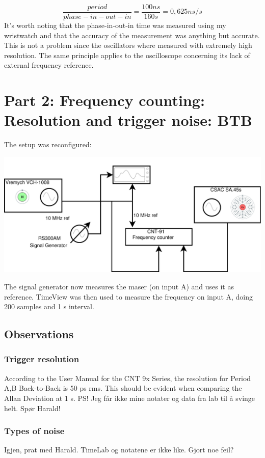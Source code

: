 \documentclass[11pt,english,a4paper]{article}
\begin{document}
\begin{displaymath}
\frac{period}{phase-in-out-in} = \frac{100 ns}{160 s} = 0,625 ns/s
\end{displaymath}
\newline
It's worth noting that the phase-in-out-in time was measured using my wristwatch and that the accuracy of the measurement was anything but accurate. This is not a problem since the oscillators where measured with extremely high resolution.
The same principle applies to the oscilloscope concerning its lack of external frequency reference.   
\newpage

\section{Part 2: Frequency counting: Resolution and trigger noise: BTB}
The setup was reconfigured:
\begin{center}
\includegraphics[width=1 \textwidth]{lab_report_diagram_del2.pdf}
\end{center}
The signal generator now measures the maser (on input A) and uses it as reference. TimeView was then used to measure the frequency  on input A, doing 200 samples and 1 s interval.

\subsection{Observations}
\subsubsection{Trigger resolution}
According to the User Manual for the CNT 9x Series, the resolution for Period A,B Back-to-Back is 50 ps rms. This should be evident when comparing the Allan Deviation at 1 s. PS! Jeg får ikke mine notater og data fra lab til å svinge helt. Spør Harald!

\subsubsection{Types of noise}
Igjen, prat med Harald. TimeLab og notatene er ikke like. Gjort noe feil?
\end{document}
